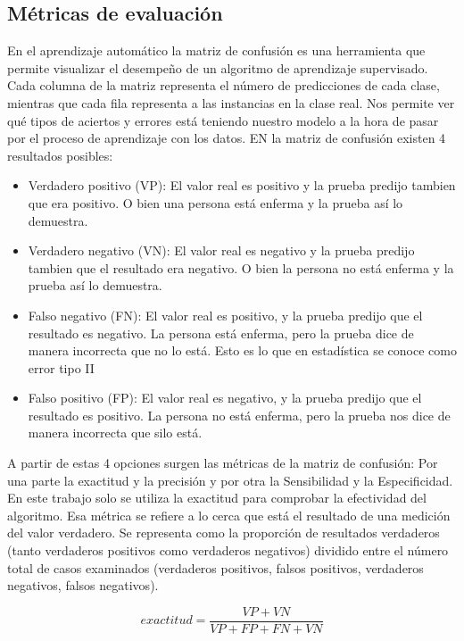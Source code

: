 \documentclass[conference]{IEEEtran}
\begin{document}
\subsection{Métricas de evaluación}
En el aprendizaje automático la matriz de confusión es una herramienta que permite visualizar el desempeño de un algoritmo  de aprendizaje supervisado. Cada columna de la matriz representa el número de predicciones de cada clase, mientras que cada fila representa a las instancias en la clase real. Nos permite ver  qué tipos de aciertos y errores está teniendo nuestro modelo a la hora de pasar por el proceso de aprendizaje con los datos. EN la matriz de confusión existen 4 resultados posibles: 

\begin{itemize}
\item Verdadero positivo (VP): El valor real es positivo y  la prueba predijo tambien que era positivo. O bien una persona está enferma y la prueba así lo demuestra.
\item Verdadero negativo (VN): El valor real  es negativo y la prueba predijo tambien que el resultado era negativo. O bien la persona no está enferma y la prueba así lo  demuestra.
\item Falso negativo (FN): El valor real es positivo, y la prueba predijo  que el resultado es negativo. La persona está enferma, pero la prueba dice de manera incorrecta que no lo está. Esto es lo que en estadística se conoce como error tipo II
\item Falso positivo (FP): El valor real es negativo, y la prueba predijo  que el resultado es positivo. La persona no está enferma, pero la prueba nos dice de manera incorrecta que silo está.
\end{itemize}

A partir de estas 4 opciones  surgen las métricas de la matriz de confusión:  Por una parte la exactitud y la precisión y por otra la Sensibilidad y la Especificidad. En este trabajo solo se utiliza la exactitud para comprobar la efectividad del algoritmo. Esa métrica se refiere a lo cerca que está el resultado de una medición del valor verdadero. Se representa como  la proporción de resultados verdaderos (tanto verdaderos positivos como verdaderos negativos) dividido entre el número total de casos examinados (verdaderos positivos, falsos positivos, verdaderos negativos, falsos negativos). 

\begin{equation}
exactitud=\frac{VP+VN}{VP+FP+FN+VN}
\end{equation}
\end{document}
